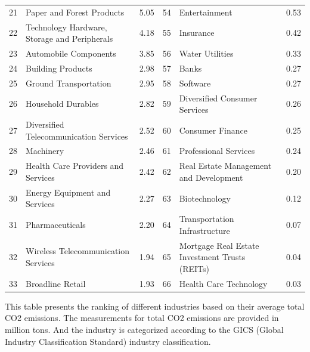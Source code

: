 \documentclass[12pt]{article}
\begin{document}
\begin{landscape}
\begin{table}[!ht]
\begin{tabular}{clcclc}
   21 &                          Paper and Forest Products &                5.05 &    54 &                                    Entertainment &                0.53 \\
   22 &       Technology Hardware, Storage and Peripherals &                4.18 &    55 &                                        Insurance &                0.42 \\
   23 &                              Automobile Components &                3.85 &    56 &                                  Water Utilities &                0.33 \\
   24 &                                  Building Products &                2.98 &    57 &                                            Banks &                0.27 \\
   25 &                              Ground Transportation &                2.95 &    58 &                                         Software &                0.27 \\
   26 &                                 Household Durables &                2.82 &    59 &                    Diversified Consumer Services &                0.26 \\
   27 &             Diversified Telecommunication Services &                2.52 &    60 &                                 Consumer Finance &                0.25 \\
   28 &                                          Machinery &                2.46 &    61 &                            Professional Services &                0.24 \\
   29 &                 Health Care Providers and Services &                2.42 &    62 &           Real Estate Management and Development &                0.20 \\
   30 &                      Energy Equipment and Services &                2.27 &    63 &                                    Biotechnology &                0.12 \\
   31 &                                    Pharmaceuticals &                2.20 &    64 &                    Transportation Infrastructure &                0.07 \\
   32 &                Wireless Telecommunication Services &                1.94 &    65 &   Mortgage Real Estate Investment Trusts (REITs) &                0.04 \\
   33 &                                   Broadline Retail &                1.93 &    66 &                           Health Care Technology &                0.03 \\
\bottomrule
\end{tabular}
\begin{tablenotes}
\footnotesize
\item This table presents the ranking of different industries based on their average total CO2 emissions. The measurements for total CO2 emissions are provided in million tons. And the industry is categorized according to the GICS (Global Industry Classification Standard) industry classification.
\end{tablenotes}
\end{table}
\end{landscape}
\end{document}

